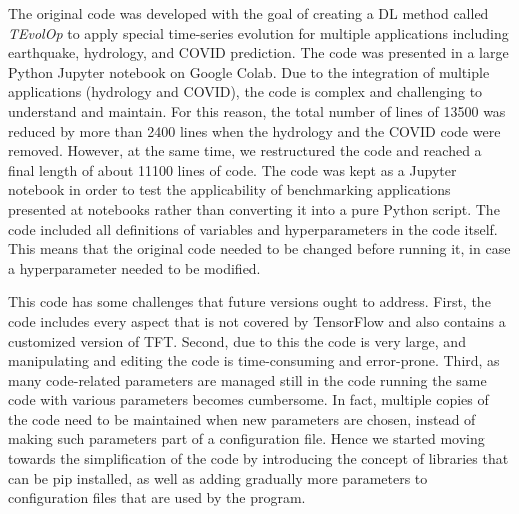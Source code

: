 \documentclass[utf8]{FrontiersinVancouver} %
\begin{document}
The original code was developed with the goal of creating a DL method called {\em TEvolOp} to apply special time-series evolution for multiple applications including earthquake, hydrology, and COVID prediction. The code was presented in a large Python Jupyter notebook on Google Colab.  Due to the integration of multiple applications (hydrology and COVID), the code is complex and challenging to understand and maintain. For this reason, the total number of lines of 13500 was reduced by more than 2400 lines when the hydrology and the COVID code were removed. However, at the same time, we restructured the code and reached a final length of about 11100 lines of code. The code was kept as a Jupyter notebook in order to test the applicability of benchmarking applications presented at notebooks rather than converting it into a pure Python script. The code included all definitions of variables and hyperparameters in the code itself. This means that the original code needed to be changed before running it, in case a hyperparameter needed to be modified.  

This code has some challenges that future versions ought to address. First, the code includes every aspect that is not covered by TensorFlow and also contains a customized version of TFT. Second, due to this the code is very large, and manipulating and editing the code is time-consuming and error-prone. 
Third, as many code-related parameters are managed still in the code running the same code with various parameters becomes cumbersome. In fact, multiple copies of the code need to be maintained when new parameters are chosen, instead of making such parameters part of a configuration file. Hence we started moving towards the simplification of the code by introducing the concept of libraries that can be pip installed, as well as adding gradually more parameters to configuration files that are used by the program.
\end{document}
